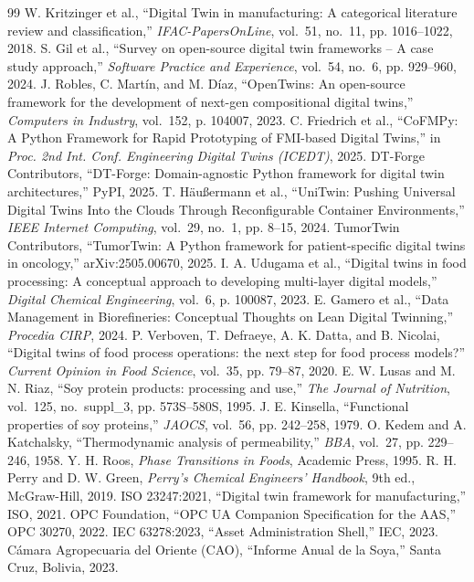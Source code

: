 \documentclass[10pt,letterpaper]{article}
\begin{document}
\begin{thebibliography}{99}
\footnotesize
{} W. Kritzinger et al., ``Digital Twin in manufacturing: A categorical literature review and classification,'' \textit{IFAC-PapersOnLine}, vol.~51, no.~11, pp. 1016--1022, 2018.
 S. Gil et al., ``Survey on open-source digital twin frameworks -- A case study approach,'' \textit{Software Practice and Experience}, vol.~54, no.~6, pp. 929--960, 2024.
 J. Robles, C. Mart\'in, and M. D\'iaz, ``OpenTwins: An open-source framework for the development of next-gen compositional digital twins,'' \textit{Computers in Industry}, vol.~152, p. 104007, 2023.
 C. Friedrich et al., ``CoFMPy: A Python Framework for Rapid Prototyping of FMI-based Digital Twins,'' in \textit{Proc. 2nd Int. Conf. Engineering Digital Twins (ICEDT)}, 2025.
 DT-Forge Contributors, ``DT-Forge: Domain-agnostic Python framework for digital twin architectures,'' PyPI, 2025.
 T. H\"au{\ss}ermann et al., ``UniTwin: Pushing Universal Digital Twins Into the Clouds Through Reconfigurable Container Environments,'' \textit{IEEE Internet Computing}, vol.~29, no.~1, pp. 8--15, 2024.
 TumorTwin Contributors, ``TumorTwin: A Python framework for patient-specific digital twins in oncology,'' arXiv:2505.00670, 2025.
 I. A. Udugama et al., ``Digital twins in food processing: A conceptual approach to developing multi-layer digital models,'' \textit{Digital Chemical Engineering}, vol.~6, p. 100087, 2023.
 E. Gamero et al., ``Data Management in Biorefineries: Conceptual Thoughts on Lean Digital Twinning,'' \textit{Procedia CIRP}, 2024.
 P. Verboven, T. Defraeye, A. K. Datta, and B. Nicolai, ``Digital twins of food process operations: the next step for food process models?'' \textit{Current Opinion in Food Science}, vol.~35, pp. 79--87, 2020.
 E. W. Lusas and M. N. Riaz, ``Soy protein products: processing and use,'' \textit{The Journal of Nutrition}, vol.~125, no.~suppl\_3, pp. 573S--580S, 1995.
 J. E. Kinsella, ``Functional properties of soy proteins,'' \textit{JAOCS}, vol.~56, pp. 242--258, 1979.
 O. Kedem and A. Katchalsky, ``Thermodynamic analysis of permeability,'' \textit{BBA}, vol.~27, pp. 229--246, 1958.
 Y. H. Roos, \textit{Phase Transitions in Foods}, Academic Press, 1995.
 R. H. Perry and D. W. Green, \textit{Perry's Chemical Engineers' Handbook}, 9th ed., McGraw-Hill, 2019.
 ISO 23247:2021, ``Digital twin framework for manufacturing,'' ISO, 2021.
 OPC Foundation, ``OPC UA Companion Specification for the AAS,'' OPC 30270, 2022.
 IEC 63278:2023, ``Asset Administration Shell,'' IEC, 2023.
 C\'amara Agropecuaria del Oriente (CAO), ``Informe Anual de la Soya,'' Santa Cruz, Bolivia, 2023.
\end{thebibliography}
\end{document}
